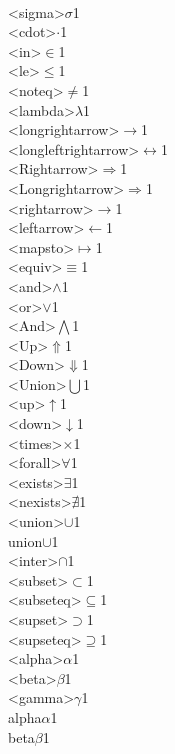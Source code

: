 {  {\\<sigma>}{{$\sigma$}}1
  {\\<cdot>}{{$\cdot$}}1
  {\\<in>}{{$\in$}}1
  {\\<le>}{{$\le$}}1
  {\\<noteq>}{{$\ne$}}1
  {\\<lambda>}{{$\lambda$}}1
  {\\<longrightarrow>}{{$\longrightarrow$}}1
  {\\<longleftrightarrow>}{{$\longleftrightarrow$}}1
  {\\<Rightarrow>}{{$\Rightarrow$}}1
  {\\<Longrightarrow>}{{$\Longrightarrow$}}1
  {\\<rightarrow>}{{$\rightarrow$}}1
  {\\<leftarrow>}{{$\leftarrow$}}1
  {\\<mapsto>}{{$\mapsto$}}1
  {\\<equiv>}{{$\equiv$}}1
  {\\<and>}{{$\wedge$}}1
  {\\<or>}{{$\vee$}}1
  {\\<And>}{{$\bigwedge$}}1
  {\\<Up>}{{$\Uparrow$}}1
  {\\<Down>}{{$\Downarrow$}}1
  {\\<Union>}{{$\bigcup$}}1
  {\\<up>}{{$\uparrow$}}1
  {\\<down>}{{$\downarrow$}}1
  {\\<times>}{{$\times$}}1
  {\\<forall>}{{$\forall$}}1
  {\\<exists>}{{$\exists$}}1
  {\\<nexists>}{{$\nexists$}}1
  {\\<union>}{{$\cup$}}1
  {\\union}{{$\cup$}}1
  {\\<inter>}{{$\cap$}}1
  {\\<subset>}{{$\subset$}}1
  {\\<subseteq>}{{$\subseteq$}}1
  {\\<supset>}{{$\supset$}}1
  {\\<supseteq>}{{$\supseteq$}}1
  {\\<alpha>}{{$\alpha$}}1
  {\\<beta>}{{$\beta$}}1
  {\\<gamma>}{{$\gamma$}}1
  {\\alpha}{{$\alpha$}}1
  {\\beta}{{$\beta$}}1
}
